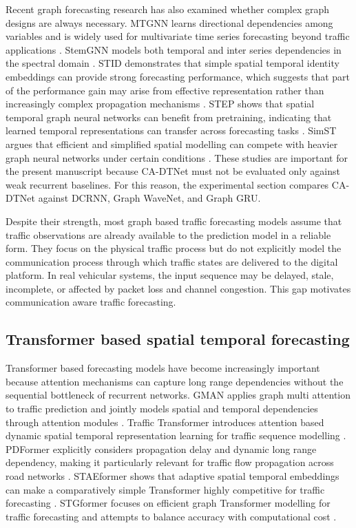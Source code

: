 \documentclass[pdflatex,sn-mathphys-num]{sn-jnl}%
\theoremstyle{thmstyleone}%
\theoremstyle{thmstyletwo}%
\theoremstyle{thmstylethree}%
\begin{document}
Recent graph forecasting research has also examined whether complex graph designs are always necessary. MTGNN learns directional dependencies among variables and is widely used for multivariate time series forecasting beyond traffic applications \cite{wu2020mtgnn}. StemGNN models both temporal and inter series dependencies in the spectral domain \cite{cao2021stemgnn}. STID demonstrates that simple spatial temporal identity embeddings can provide strong forecasting performance, which suggests that part of the performance gain may arise from effective representation rather than increasingly complex propagation mechanisms \cite{shao2022stid}. STEP shows that spatial temporal graph neural networks can benefit from pretraining, indicating that learned temporal representations can transfer across forecasting tasks \cite{shao2022step}. SimST argues that efficient and simplified spatial modelling can compete with heavier graph neural networks under certain conditions \cite{liu2023simst}. These studies are important for the present manuscript because CA-DTNet must not be evaluated only against weak recurrent baselines. For this reason, the experimental section compares CA-DTNet against DCRNN, Graph WaveNet, and Graph GRU.

Despite their strength, most graph based traffic forecasting models assume that traffic observations are already available to the prediction model in a reliable form. They focus on the physical traffic process but do not explicitly model the communication process through which traffic states are delivered to the digital platform. In real vehicular systems, the input sequence may be delayed, stale, incomplete, or affected by packet loss and channel congestion. This gap motivates communication aware traffic forecasting.

\subsection{Transformer based spatial temporal forecasting}

Transformer based forecasting models have become increasingly important because attention mechanisms can capture long range dependencies without the sequential bottleneck of recurrent networks. GMAN applies graph multi attention to traffic prediction and jointly models spatial and temporal dependencies through attention modules \cite{zheng2020gman}. Traffic Transformer introduces attention based dynamic spatial temporal representation learning for traffic sequence modelling \cite{yan2021traffictransformer}. PDFormer explicitly considers propagation delay and dynamic long range dependency, making it particularly relevant for traffic flow propagation across road networks \cite{jiang2023pdformer}. STAEformer shows that adaptive spatial temporal embeddings can make a comparatively simple Transformer highly competitive for traffic forecasting \cite{liu2023staeformer}. STGformer focuses on efficient graph Transformer modelling for traffic forecasting and attempts to balance accuracy with computational cost \cite{wang2024stgformer}.
\end{document}
